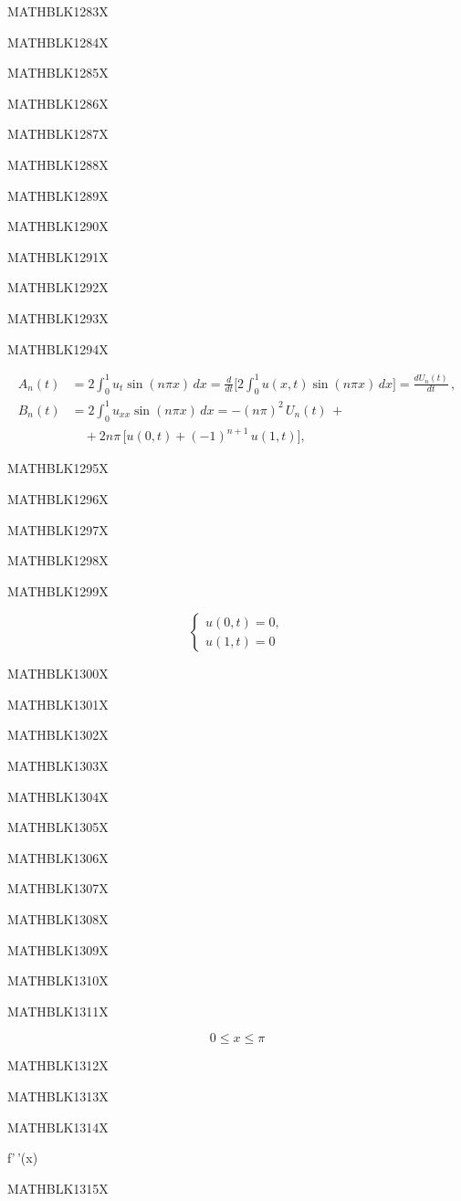 \documentclass[
  ukrainian,
]{article}
\begin{document}
MATHBLK1283X

MATHBLK1284X

MATHBLK1285X

MATHBLK1286X

MATHBLK1287X

MATHBLK1288X

MATHBLK1289X

MATHBLK1290X

MATHBLK1291X

MATHBLK1292X

MATHBLK1293X

MATHBLK1294X

\[
\begin{split} A_n(t) &= 2\int_0^1 u_t \sin(n\pi x) \, dx = \frac{d}{dt} \bigg[ 2\int_0^1 u(x, t) \sin(n\pi x) \, dx \bigg] = \frac{dU_n(t)}{dt} \,, \\ B_n(t) &= 2\int_0^1 u_{xx} \sin(n\pi x) \, dx = -(n\pi)^2 \, U_n(t) \,+ \\ &\quad + 2n\pi \, \big[ u(0, t) + (-1)^{n+1} \, u(1, t) \big], \end{split}
\]

MATHBLK1295X

MATHBLK1296X

MATHBLK1297X

MATHBLK1298X

MATHBLK1299X

\[
\begin{cases} u(0, t) = 0, \\ u(1, t) = 0 \end{cases}
\]

MATHBLK1300X

MATHBLK1301X

MATHBLK1302X

MATHBLK1303X

MATHBLK1304X

MATHBLK1305X

MATHBLK1306X

MATHBLK1307X

MATHBLK1308X

MATHBLK1309X

MATHBLK1310X

MATHBLK1311X

\[
0 \le x \le \pi
\]

MATHBLK1312X

MATHBLK1313X

MATHBLK1314X

f'\,'(x)

MATHBLK1315X
\end{document}
